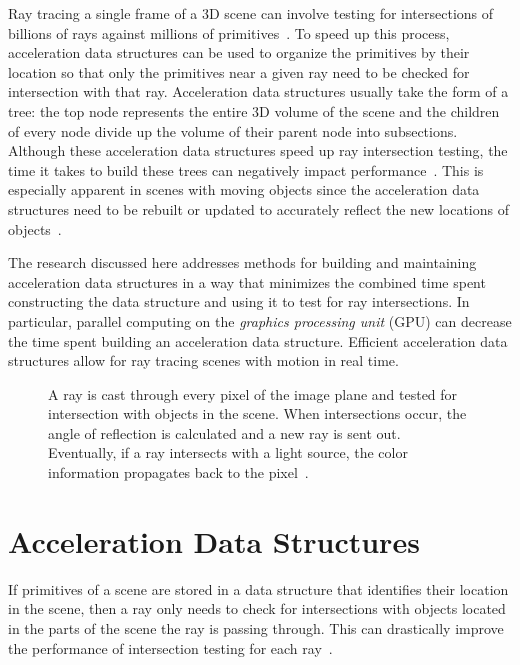 \documentclass{sig-alternate}
\begin{document}
Ray tracing a single frame of a 3D scene can involve testing for intersections of billions of rays against millions of primitives~\cite{Gribble:2012, Wald:2007}. To speed up this process, acceleration data structures can be used to organize the primitives by their location so that only the primitives near a given ray need to be checked for intersection with that ray. Acceleration data structures usually take the form of a tree: the top node represents the entire 3D volume of the scene and the children of every node divide up the volume of their parent node into subsections. Although these acceleration data structures speed up ray intersection testing, the time it takes to build these trees can negatively impact performance~\cite{Garanzha:2011}. This is especially apparent in scenes with moving objects since the acceleration data structures need to be rebuilt or updated to accurately reflect the new locations of objects~\cite{Wald:2007}.

The research discussed here addresses methods for building and maintaining acceleration data structures in a way that minimizes the combined time spent constructing the data structure and using it to test for ray intersections. In particular, parallel computing on the \emph{graphics processing unit} (GPU) can decrease the time spent building an acceleration data structure. Efficient acceleration data structures allow for ray tracing scenes with motion in real time.

\begin{figure}
\centering
{}
\caption{A ray is cast through every pixel of the image plane and tested for intersection with objects in the scene. When intersections occur, the angle of reflection is calculated and a new ray is sent out. Eventually, if a ray intersects with a light source, the color information propagates back to the pixel~\cite{Gribble:2012, wiki:rayTracing}.}
\label{fig:ray_diagram}
\end{figure}

\section{Acceleration Data Structures}
\label{sec:accel}

If primitives of a scene are stored in a data structure that identifies their location in the scene, then a ray only needs to check for intersections with objects located in the parts of the scene the ray is passing through. This can drastically improve the performance of intersection testing for each ray~\cite{wiki:rayTracing}.
\end{document}
